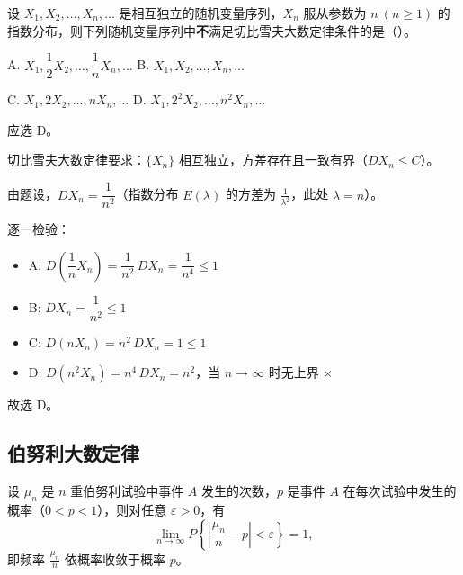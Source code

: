 ﻿\documentclass[lang=cn,11pt]{elegantbook}
\begin{document}
\begin{exercise}\label{exer:5-lln-exponential}
设 \(X_1, X_2, \dots, X_n, \dots\) 是相互独立的随机变量序列，\(X_n\) 服从参数为 \(n\ (n \geq 1)\) 的指数分布，则下列随机变量序列中\textbf{不}满足切比雪夫大数定律条件的是（\quad）。\par
A. \(X_1, \dfrac{1}{2}X_2, \dots, \dfrac{1}{n}X_n, \dots\)\quad
B. \(X_1, X_2, \dots, X_n, \dots\)\par
C. \(X_1, 2X_2, \dots, nX_n, \dots\)\quad
D. \(X_1, 2^2X_2, \dots, n^2X_n, \dots\)
\end{exercise}

\begin{solution}
应选 D。

切比雪夫大数定律要求：\(\{X_n\}\) 相互独立，方差存在且一致有界（\(DX_n \leq C\)）。

由题设，\(DX_n = \dfrac{1}{n^2}\)（指数分布 \(E(\lambda)\) 的方差为 \(\frac{1}{\lambda^2}\)，此处 \(\lambda = n\)）。

逐一检验：
\begin{itemize}
    \item A: \(D\!\left(\dfrac{1}{n}X_n\right) = \dfrac{1}{n^2}\,DX_n = \dfrac{1}{n^4} \leq 1\) \checkmark
    \item B: \(DX_n = \dfrac{1}{n^2} \leq 1\) \checkmark
    \item C: \(D(nX_n) = n^2\,DX_n = 1 \leq 1\) \checkmark
    \item D: \(D(n^2 X_n) = n^4\,DX_n = n^2\)，当 \(n \to \infty\) 时无上界 \(\times\)
\end{itemize}
故选 D。
\end{solution}

\subsection{伯努利大数定律}

\begin{theorem}[伯努利大数定律] \label{thm:bernoulli-lln}
设 \(\mu_n\) 是 \(n\) 重伯努利试验中事件 \(A\) 发生的次数，\(p\) 是事件 \(A\) 在每次试验中发生的概率（\(0 < p < 1\)），则对任意 \(\varepsilon > 0\)，有
\[
\lim_{n\to\infty} P\!\left\{\left|\frac{\mu_n}{n} - p\right| < \varepsilon\right\} = 1,
\]
即频率 \(\frac{\mu_n}{n}\) 依概率收敛于概率 \(p\)。
\end{theorem}
\end{document}
